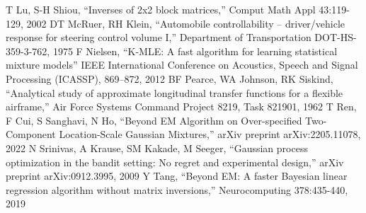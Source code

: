 \documentclass[12pt, conference]{IEEEtran}
\begin{document}
\begin{thebibliography}{00}
 T Lu, S-H Shiou, ``Inverses of 2x2 block matrices,'' Comput Math Appl 43:119-129, 2002
 DT McRuer, RH Klein, ``Automobile controllability -- driver/vehicle response for steering control volume I,'' Department of Transportation DOT-HS-359-3-762, 1975
 F Nielsen, ``K-MLE: A fast algorithm for learning statistical mixture models'' IEEE International Conference on Acoustics, Speech and Signal Processing (ICASSP), 869–872, 2012
 BF Pearce, WA Johnson, RK Siskind, ``Analytical study of approximate longitudinal transfer functions for a flexible airframe,'' Air Force Systems Command Project 8219, Task 821901, 1962
 T Ren, F Cui, S Sanghavi, N Ho, ``Beyond EM Algorithm on Over-specified Two-Component Location-Scale Gaussian Mixtures,'' arXiv preprint arXiv:2205.11078, 2022
 N Srinivas, A Krause, SM Kakade, M Seeger, ``Gaussian process optimization in the bandit setting: No regret and experimental design,'' arXiv preprint arXiv:0912.3995, 2009
 Y Tang, ``Beyond EM: A faster Bayesian linear regression algorithm without matrix inversions,'' Neurocomputing 378:435-440, 2019
\end{thebibliography}
\end{document}
